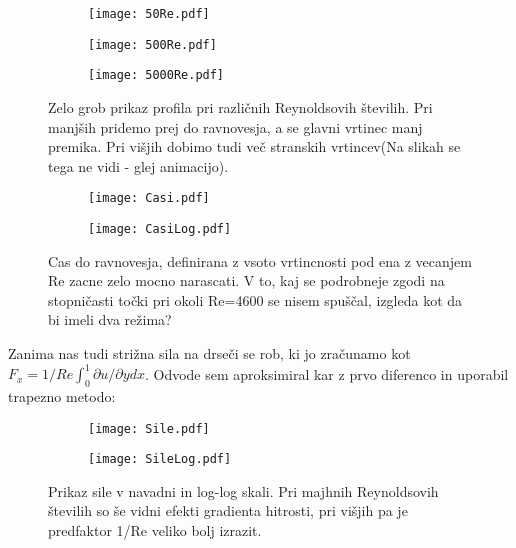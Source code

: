 \documentclass{article}
\begin{document}
\begin{figure}[H]
\centering
\begin{subfigure}{.32\textwidth}
\texttt{[image: 50Re.pdf]}
\end{subfigure}
\begin{subfigure}{.32\textwidth}
\texttt{[image: 500Re.pdf]}
\end{subfigure}
\begin{subfigure}{.32\textwidth}
\texttt{[image: 5000Re.pdf]}
\end{subfigure}
\caption*{Zelo grob prikaz profila pri različnih Reynoldsovih številih. Pri manjših pridemo prej do ravnovesja, a se glavni vrtinec manj premika. Pri višjih dobimo tudi več stranskih vrtincev(Na slikah se tega ne vidi - glej animacijo).}
\end{figure}

\begin{figure}[H]
\centering
\begin{subfigure}{.49\textwidth}
\texttt{[image: Casi.pdf]}
\end{subfigure}
\begin{subfigure}{.49\textwidth}
\texttt{[image: CasiLog.pdf]}
\end{subfigure}
\caption*{Cas do ravnovesja, definirana z vsoto vrtincnosti pod ena z  vecanjem Re zacne zelo mocno narascati. V to, kaj se podrobneje zgodi na stopničasti točki pri okoli Re=4600 se nisem spuščal, izgleda kot da bi imeli dva režima?}
\end{figure}

\newpage
Zanima nas tudi strižna sila na drseči se rob, ki jo zračunamo kot $F_x = 1/Re \int_0^1 \partial u / \partial y dx$. Odvode sem aproksimiral kar z prvo diferenco in uporabil trapezno metodo:

\begin{figure}[H]
\centering
\begin{subfigure}{.49\textwidth}
\texttt{[image: Sile.pdf]}
\end{subfigure}
\begin{subfigure}{.49\textwidth}
\texttt{[image: SileLog.pdf]}
\end{subfigure}
\caption*{Prikaz sile v navadni in log-log skali. Pri majhnih Reynoldsovih številih so še vidni efekti gradienta hitrosti, pri višjih pa je predfaktor 1/Re veliko bolj izrazit.}
\end{figure}
\end{document}
